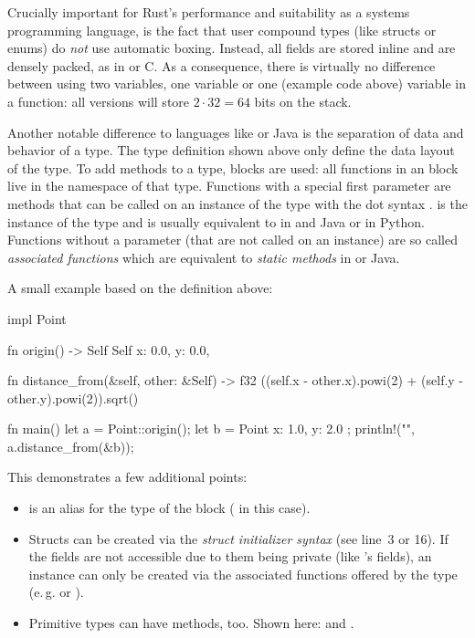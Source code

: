 Crucially important for Rust's performance and suitability as a systems programming language, is the fact that user compound types (like structs or enums) do \emph{not} use automatic boxing.
Instead, all fields are stored inline and are densely packed, as in \cpp or C.
As a consequence, there is virtually no difference between using two  variables, one \code{[f32; 2]} variable or one  (example code above) variable in a function: all versions will store $2 \cdot 32 = 64$ bits on the stack.

Another notable difference to languages like \cpp or Java is the separation of data and behavior of a type.
The type definition shown above only define the data layout of the type.
To add methods to a type,  blocks are used: all functions in an  block live in the namespace of that type.
Functions with a special first  parameter are methods that can be called on an instance of the type with the dot syntax .
 is the instance of the type and is usually equivalent to  in \cpp and Java or  in Python.
Functions without a  parameter (that are not called on an instance) are so called \emph{associated functions} which are equivalent to \emph{static methods} in \cpp or Java.

A small example based on the  definition above:


\begin{rustcode}
impl Point {
    fn origin() -> Self {
        Self {
            x: 0.0,
            y: 0.0,
        }
    }

    fn distance_from(&self, other: &Self) -> f32 {
        ((self.x - other.x).powi(2) + (self.y - other.y).powi(2)).sqrt()
    }
}

fn main() {
    let a = Point::origin();
    let b = Point { x: 1.0, y: 2.0 };
    println!("{}", a.distance_from(&b));
}
\end{rustcode}

This demonstrates a few additional points:

\vspace{-3mm}
\begin{itemize}
  \item {} is an alias for the type of the  block ( in this case).
  \item Structs can be created via the \emph{struct initializer syntax} (see line~3 or 16).
  If the fields are not accessible due to them being private (like 's fields), an instance can only be created via the associated functions offered by the type (e.\,g.  or ).
  \item Primitive types can have methods, too.
  Shown here:  and .
\end{itemize}

